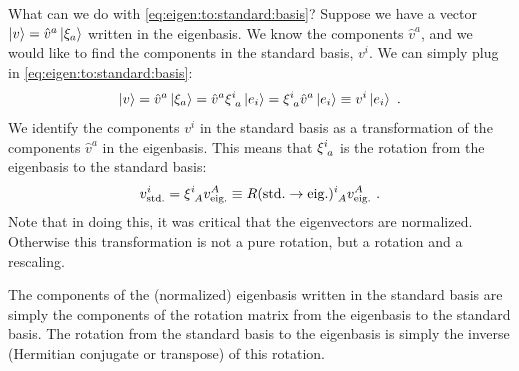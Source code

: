 \documentclass[12pt, oneside]{report}    %
\begin{document}
What can we do with \eqref{eq:eigen:to:standard:basis}? Suppose we have a vector $\left|v\right\rangle = \hat v^a\left|\xi_a\right\rangle$ written in the eigenbasis. We know the components $\hat v^a$, and we would like to find the components in the standard basis, $v^i$. We can simply plug in \eqref{eq:eigen:to:standard:basis}:
\begin{align}
    \ket{v} = 
    \hat v^a\ket{\xi_a}
    = \hat v^a \xi\aij{i}{a} \ket{e_i} =  \xi\aij{i}{a}\hat v^a \ket{e_i}
    \equiv v^i \ket{e_i} \ .
    \label{eq:vA:as:vi}
\end{align}
% 
% 
We identify the components $v^i$ in the standard basis as a transformation of the components $\hat v^a$ in the eigenbasis. This means that $\xi\aij{i}{a}$ is the rotation from the eigenbasis to the standard basis:
\begin{align}
    v^i_\text{std.} = \xi\aij{i}{A}v^A_\text{eig.} \equiv R(\text{std.}\to\text{eig.})\aij{i}{A}v^A_\text{eig.} \ .
\end{align}
Note that in doing this, it was critical that the eigenvectors are normalized. Otherwise this transformation is not a pure rotation, but a rotation and a rescaling. 

\begin{bigidea}
The components of the (normalized) eigenbasis written in the standard basis are simply the components of the rotation matrix from the eigenbasis to the standard basis. The rotation from the standard basis to the eigenbasis is simply the inverse (Hermitian conjugate or transpose) of this rotation. 
\end{bigidea}
\end{document}
